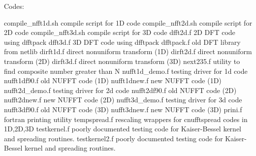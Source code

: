 Codes:

compile_nfft1d.sh  compile script for 1D code
compile_nfft2d.sh  compile script for 2D code
compile_nfft3d.sh  compile script for 3D code
dfft2d.f           2D DFT code using dfftpack
dfft3d.f           3D DFT code using dfftpack
dfftpack.f         old DFT library from netlib
dirft1d.f          direct nonuniform transform (1D)
dirft2d.f          direct nonuniform transform (2D)
dirft3d.f          direct nonuniform transform (3D)
next235.f          utility to find composite number greater than N
nufft1d_demo.f     testing driver for 1d code
nufft1df90.f       old NUFFT code (1D)
nufft1dnew.f       new NUFFT code (1D)
nufft2d_demo.f     testing driver for 2d code
nufft2df90.f       old NUFFT code (2D)
nufft2dnew.f       new NUFFT code (2D)
nufft3d_demo.f     testing driver for 3d code
nufft3df90.f       old NUFFT code (3D)
nufft3dnew.f       new NUFFT code (3D)
prini.f            fortran printing utility
tempspread.f       rescaling wrappers for cnufftspread codes in 
                   1D,2D,3D
testkernel.f       poorly documented testing code for Kaiser-Bessel
                   kernel and spreading routines.
testkernel2.f      poorly documented testing code for Kaiser-Bessel
                   kernel and spreading routines.
